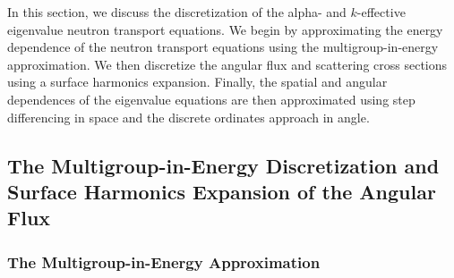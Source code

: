 In this section, we discuss the discretization of the alpha- and $k$-effective eigenvalue neutron transport equations. We begin by approximating the energy dependence of the neutron transport equations using the multigroup-in-energy approximation. We then discretize the angular flux and scattering cross sections using a surface harmonics expansion. Finally, the spatial and angular dependences of the eigenvalue equations are then approximated using step differencing in space and the discrete ordinates approach in angle.

\subsection{The Multigroup-in-Energy Discretization and Surface Harmonics Expansion of the Angular Flux}

\subsubsection{The Multigroup-in-Energy Approximation}

